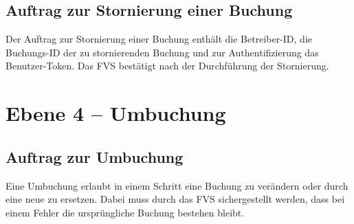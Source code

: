 \subsection{Auftrag zur Stornierung einer Buchung}
Der Auftrag zur Stornierung einer Buchung enthält die Betreiber-ID, die Buchungs-ID der zu stornierenden Buchung und zur Authentifizierung das Benutzer-Token. Das FVS bestätigt nach der Durchführung der Stornierung.

\section{Ebene 4 -- Umbuchung}

\subsection{Auftrag zur Umbuchung}
Eine Umbuchung erlaubt in einem Schritt eine Buchung zu verändern oder durch eine neue zu ersetzen. Dabei muss durch das FVS sichergestellt werden, dass bei einem Fehler die ursprüngliche Buchung bestehen bleibt.